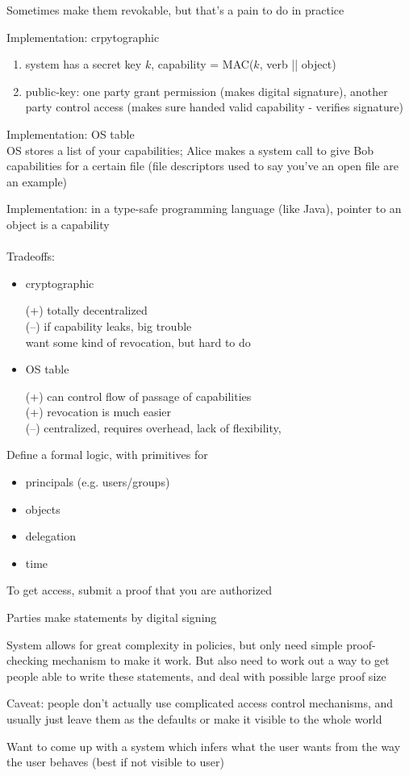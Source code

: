 Sometimes make them revokable, but that's a pain to do in practice

Implementation: crpytographic
\begin{enumerate}
    \item system has a secret key $k$, capability = MAC($k$, verb || object)
    \item public-key: one party grant permission (makes digital signature),
    another party control access (makes sure handed valid capability - verifies
    signature)
\end{enumerate}
Implementation: OS table\\
OS stores a list of your capabilities; Alice makes a system call to give Bob
capabilities for a certain file (file descriptors used to say you've an open
file are an example)

Implementation: in a type-safe programming language (like Java), pointer to an
object is a capability
\\
\\
Tradeoffs:
\begin{itemize}
    \item cryptographic

    (+) totally decentralized \\
    (--) if capability leaks, big trouble\\
    want some kind of revocation, but hard to do
    
    \item OS table
    
    (+) can control flow of passage of capabilities\\
    (+) revocation is much easier\\
    (--) centralized, requires overhead, lack of flexibility, 
\end{itemize}

Define a formal logic, with primitives for
\begin{itemize}
    \item principals (e.g. users/groups)
    \item objects
    \item delegation
    \item time
\end{itemize}
To get access, submit a proof that you are authorized

Parties make statements by digital signing

System allows for great complexity in policies, but only need simple proof-
checking mechanism to make it work. But also need to work out a way to get
people able to write these statements, and deal with possible large proof size

Caveat: people don't actually use complicated access control mechanisms, and
usually just leave them as the defaults or make it visible to the whole world

Want to come up with a system which infers what the user wants from the way the
user behaves (best if not visible to user)
